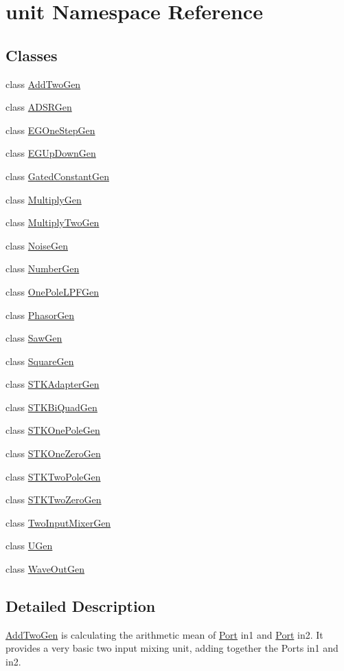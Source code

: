 \hypertarget{namespaceunit}{}\section{unit Namespace Reference}
\label{namespaceunit}
\subsection*{Classes}
\begin{DoxyCompactItemize}
\item 
class \hyperlink{classunit_1_1AddTwoGen}{Add\+Two\+Gen}
\item 
class \hyperlink{classunit_1_1ADSRGen}{A\+D\+S\+R\+Gen}
\item 
class \hyperlink{classunit_1_1EGOneStepGen}{E\+G\+One\+Step\+Gen}
\item 
class \hyperlink{classunit_1_1EGUpDownGen}{E\+G\+Up\+Down\+Gen}
\item 
class \hyperlink{classunit_1_1GatedConstantGen}{Gated\+Constant\+Gen}
\item 
class \hyperlink{classunit_1_1MultiplyGen}{Multiply\+Gen}
\item 
class \hyperlink{classunit_1_1MultiplyTwoGen}{Multiply\+Two\+Gen}
\item 
class \hyperlink{classunit_1_1NoiseGen}{Noise\+Gen}
\item 
class \hyperlink{classunit_1_1NumberGen}{Number\+Gen}
\item 
class \hyperlink{classunit_1_1OnePoleLPFGen}{One\+Pole\+L\+P\+F\+Gen}
\item 
class \hyperlink{classunit_1_1PhasorGen}{Phasor\+Gen}
\item 
class \hyperlink{classunit_1_1SawGen}{Saw\+Gen}
\item 
class \hyperlink{classunit_1_1SquareGen}{Square\+Gen}
\item 
class \hyperlink{classunit_1_1STKAdapterGen}{S\+T\+K\+Adapter\+Gen}
\item 
class \hyperlink{classunit_1_1STKBiQuadGen}{S\+T\+K\+Bi\+Quad\+Gen}
\item 
class \hyperlink{classunit_1_1STKOnePoleGen}{S\+T\+K\+One\+Pole\+Gen}
\item 
class \hyperlink{classunit_1_1STKOneZeroGen}{S\+T\+K\+One\+Zero\+Gen}
\item 
class \hyperlink{classunit_1_1STKTwoPoleGen}{S\+T\+K\+Two\+Pole\+Gen}
\item 
class \hyperlink{classunit_1_1STKTwoZeroGen}{S\+T\+K\+Two\+Zero\+Gen}
\item 
class \hyperlink{classunit_1_1TwoInputMixerGen}{Two\+Input\+Mixer\+Gen}
\item 
class \hyperlink{classunit_1_1UGen}{U\+Gen}
\item 
class \hyperlink{classunit_1_1WaveOutGen}{Wave\+Out\+Gen}
\end{DoxyCompactItemize}


\subsection{Detailed Description}
\hyperlink{classunit_1_1AddTwoGen}{Add\+Two\+Gen} is calculating the arithmetic mean of \hyperlink{classPort}{Port} in1 and \hyperlink{classPort}{Port} in2. It provides a very basic two input mixing unit, adding together the Ports in1 and in2. 